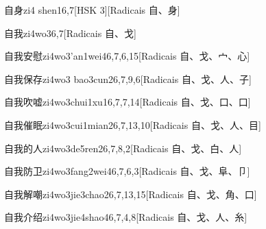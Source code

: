 \begin{entry}{自身}{zi4 shen1}{6,7}[HSK 3][Radicais ⾃、⾝]
\end{entry}

\begin{entry}{自我}{zi4wo3}{6,7}[Radicais ⾃、⼽]
\end{entry}

\begin{entry}{自我安慰}{zi4wo3'an1wei4}{6,7,6,15}[Radicais ⾃、⼽、⼧、⼼]
\end{entry}

\begin{entry}{自我保存}{zi4wo3 bao3cun2}{6,7,9,6}[Radicais ⾃、⼽、⼈、⼦]
\end{entry}

\begin{entry}{自我吹嘘}{zi4wo3chui1xu1}{6,7,7,14}[Radicais ⾃、⼽、⼝、⼝]
\end{entry}

\begin{entry}{自我催眠}{zi4wo3cui1mian2}{6,7,13,10}[Radicais ⾃、⼽、⼈、⽬]
\end{entry}

\begin{entry}{自我的人}{zi4wo3de5ren2}{6,7,8,2}[Radicais ⾃、⼽、⽩、⼈]
\end{entry}

\begin{entry}{自我防卫}{zi4wo3fang2wei4}{6,7,6,3}[Radicais ⾃、⼽、⾩、⼙]
\end{entry}

\begin{entry}{自我解嘲}{zi4wo3jie3chao2}{6,7,13,15}[Radicais ⾃、⼽、⾓、⼝]
\end{entry}

\begin{entry}{自我介绍}{zi4wo3jie4shao4}{6,7,4,8}[Radicais ⾃、⼽、⼈、⽷]
\end{entry}

